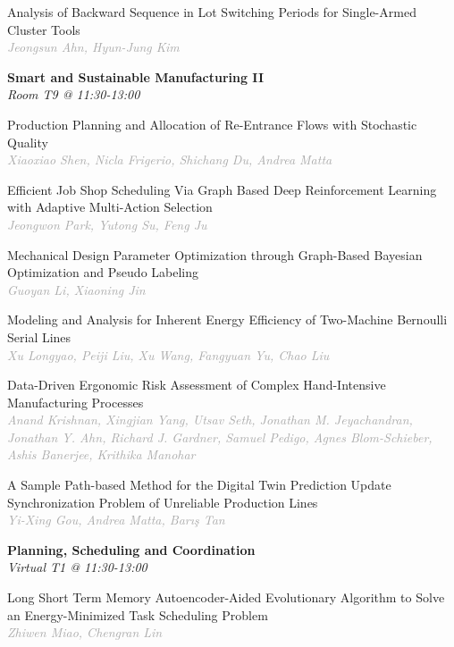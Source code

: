 \begin{multicols*}{2}
\small Analysis of Backward Sequence in Lot Switching Periods for Single-Armed Cluster Tools\\ 
\footnotesize \textcolor{darkgray}{\textit{Jeongsun Ahn, Hyun-Jung  Kim}}

\normalsize \textbf{Smart and Sustainable Manufacturing II}\\
\small \textit{Room T9 @ 11:30-13:00}

\small Production Planning and Allocation of Re-Entrance Flows with Stochastic Quality\\ 
\footnotesize \textcolor{darkgray}{\textit{Xiaoxiao Shen, Nicla  Frigerio, Shichang  Du, Andrea  Matta}}

\small Efficient Job Shop Scheduling Via Graph Based Deep Reinforcement Learning with Adaptive Multi-Action Selection\\ 
\footnotesize \textcolor{darkgray}{\textit{Jeongwon Park, Yutong  Su, Feng  Ju}}

\small Mechanical Design Parameter Optimization through Graph-Based Bayesian Optimization and Pseudo Labeling\\ 
\footnotesize \textcolor{darkgray}{\textit{Guoyan Li, Xiaoning  Jin}}

\small Modeling and Analysis for Inherent Energy Efficiency of Two-Machine Bernoulli Serial Lines\\ 
\footnotesize \textcolor{darkgray}{\textit{Xu Longyao, Peiji  Liu, Xu  Wang, Fangyuan  Yu, Chao  Liu}}

\small Data-Driven Ergonomic Risk Assessment of Complex Hand-Intensive Manufacturing Processes\\ 
\footnotesize \textcolor{darkgray}{\textit{Anand Krishnan, Xingjian  Yang, Utsav  Seth, Jonathan  M. Jeyachandran, Jonathan  Y. Ahn, Richard  J. Gardner, Samuel  Pedigo, Agnes  Blom-Schieber, Ashis  Banerjee, Krithika  Manohar}}

\small A Sample Path-based Method for the Digital Twin Prediction Update Synchronization Problem of Unreliable Production Lines\\ 
\footnotesize \textcolor{darkgray}{\textit{Yi-Xing Gou, Andrea  Matta, Barış Tan}}

\normalsize \textbf{Planning, Scheduling and Coordination}\\
\small \textit{Virtual T1 @ 11:30-13:00}

\small Long Short Term Memory Autoencoder-Aided Evolutionary Algorithm to Solve an Energy-Minimized Task Scheduling Problem\\ 
\footnotesize \textcolor{darkgray}{\textit{Zhiwen Miao, Chengran  Lin}}


\end{multicols*}
